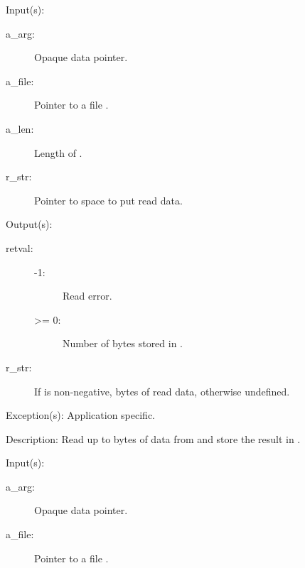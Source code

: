 \begin{capi}
\label{cw_nxo_file_read_t}
	\begin{capilist}
	\item[Input(s): ]
		\begin{description}\item[]
		\item[a\_arg: ]
			Opaque data pointer.
		\item[a\_file: ]
			Pointer to a file .
		\item[a\_len: ]
			Length of .
		\item[r\_str: ]
			Pointer to space to put read data.
		\end{description}
	\item[Output(s): ]
		\begin{description}\item[]
		\item[retval: ]
			\begin{description}\item[]
			\item[-1: ]
				Read error.
			\item[>= 0: ]
				Number of bytes stored in .
			\end{description}
		\item[r\_str: ]
			If  is non-negative,  bytes of
			read data, otherwise undefined.
		\end{description}
	\item[Exception(s): ] Application specific.
	\item[Description: ]
		Read up to  bytes of data from  and
		store the result in .
	\end{capilist}
\label{cw_nxo_file_write_t}
	\begin{capilist}
	\item[Input(s): ]
		\begin{description}\item[]
		\item[a\_arg: ]
			Opaque data pointer.
		\item[a\_file: ]
			Pointer to a file \classname{nxo}.

\end{description}
\end{capilist}
\end{capi}
